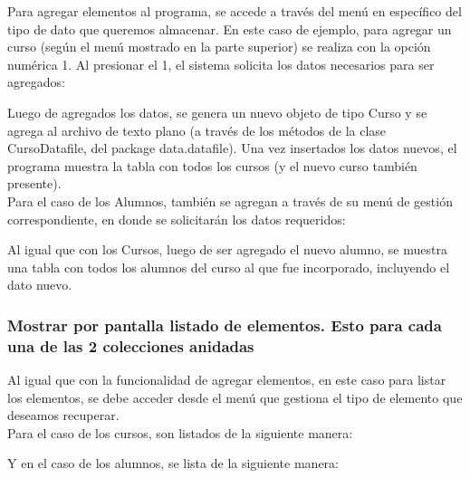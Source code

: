 Para agregar elementos al programa, se accede a través del menú en específico del tipo de dato que queremos almacenar. En este caso de ejemplo, para agregar un curso (según el menú mostrado en la parte superior) se realiza con la opción numérica 1. Al presionar el 1, el sistema solicita los datos necesarios para ser agregados:


Luego de agregados los datos, se genera un nuevo objeto de tipo Curso y se agrega al archivo de texto plano (a través de los métodos de la clase CursoDatafile, del package data.datafile). Una vez insertados los datos nuevos, el programa muestra la tabla con todos los cursos (y el nuevo curso también presente).\\

Para el caso de los Alumnos, también se agregan a través de su menú de gestión correspondiente, en donde se solicitarán los datos requeridos:


Al igual que con los Cursos, luego de ser agregado el nuevo alumno, se muestra una tabla con todos los alumnos del curso al que fue incorporado, incluyendo el dato nuevo.

\subsubsection{Mostrar por pantalla listado de elementos. Esto para cada una de las 2 colecciones anidadas}

Al igual que con la funcionalidad de agregar elementos, en este caso para listar los elementos, se debe acceder desde el menú que gestiona el tipo de elemento que deseamos recuperar.\\

Para el caso de los cursos, son listados de la siguiente manera:


\clearpage

Y en el caso de los alumnos, se lista de la siguiente manera:

